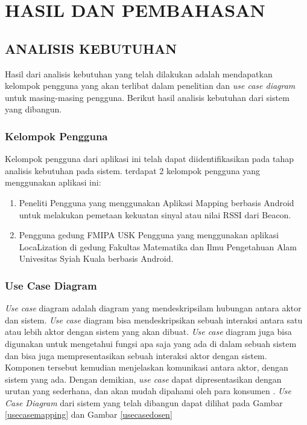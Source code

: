 \fancyhf{}
\fancyfoot[C]{\thepage}
\chapter{HASIL DAN PEMBAHASAN}
\section{ANALISIS KEBUTUHAN}

Hasil dari analisis kebutuhan yang telah dilakukan adalah mendapatkan kelompok pengguna yang akan terlibat dalam penelitian dan \textit{use case diagram} untuk masing-masing pengguna. Berikut hasil analisis kebutuhan dari sistem yang dibangun.
\subsection{Kelompok Pengguna}
Kelompok pengguna dari aplikasi ini telah dapat diidentifikasikan pada tahap analisis kebutuhan pada sistem. terdapat 2 kelompok pengguna yang menggunakan aplikasi ini:
\begin{enumerate}[1.]
	\item Peneliti
	      \newline Pengguna yang menggunakan Aplikasi Mapping berbasis Android untuk melakukan pemetaan kekuatan sinyal atau nilai RSSI dari Beacon.
	\item Pengguna gedung FMIPA USK
	      \newline Pengguna yang menggunakan aplikasi LocaLization di gedung Fakultas Matematika dan Ilmu Pengetahuan Alam Univesitas Syiah Kuala berbasis Android.
\end{enumerate}

\subsection{Use Case Diagram}
\textit{Use case} diagram adalah diagram yang mendeskripsilam hubungan antara aktor dan sistem. \textit{Use case} diagram bisa mendeskripsikan sebuah interaksi antara satu atau lebih aktor dengan sistem yang akan dibuat. \textit{Use case} diagram juga bisa digunakan untuk mengetahui fungsi apa saja yang ada di dalam sebuah sistem dan  bisa juga mempresentasikan sebuah interaksi aktor dengan sistem. Komponen tersebut kemudian menjelaskan komunikasi antara aktor,  dengan sistem yang ada. Dengan demikian, \textit{use case} dapat dipresentasikan dengan urutan yang sederhana, dan akan mudah dipahami oleh para konsumen \citep{Yu2009}. \textit{Use Case Diagram} dari sistem yang telah dibangun dapat dilihat pada Gambar \ref{usecasemapping} dan Gambar \ref{usecasedosen}

